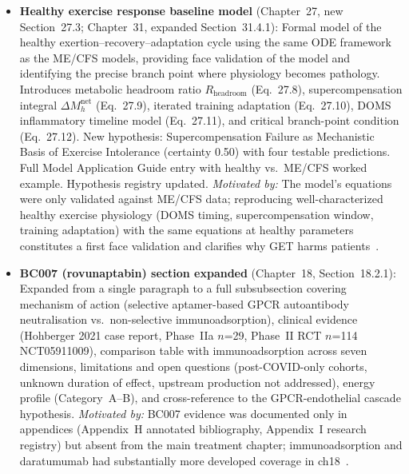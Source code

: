 \begin{itemize}
  \item \textbf{Healthy exercise response baseline model} (Chapter~27, new
    Section~27.3; Chapter~31, expanded Section~31.4.1): Formal model of the
    healthy exertion--recovery--adaptation cycle using the same ODE framework as
    the ME/CFS models, providing face validation of the model and identifying the
    precise branch point where physiology becomes pathology. Introduces metabolic
    headroom ratio $R_{\text{headroom}}$ (Eq.~27.8), supercompensation integral
    $\Delta M_h^{\text{net}}$ (Eq.~27.9), iterated training adaptation
    (Eq.~27.10), DOMS inflammatory timeline model (Eq.~27.11), and critical
    branch-point condition (Eq.~27.12). New hypothesis: Supercompensation Failure
    as Mechanistic Basis of Exercise Intolerance (certainty 0.50) with four
    testable predictions. Full Model Application Guide entry with healthy vs.\
    ME/CFS worked example. Hypothesis registry updated.
    \textit{Motivated by:} The model's equations were only validated against
    ME/CFS data; reproducing well-characterized healthy exercise physiology
    (DOMS timing, supercompensation window, training adaptation) with the same
    equations at healthy parameters constitutes a first face validation and
    clarifies why GET harms
    patients~\cite{Hood2009biogenesis,Clarkson2002DOMS,Peake2017muscle,Geraghty2019GET}.

  \item \textbf{BC007 (rovunaptabin) section expanded} (Chapter~18,
    Section~18.2.1): Expanded from a single paragraph to a full subsubsection
    covering mechanism of action (selective aptamer-based GPCR autoantibody
    neutralisation vs.\ non-selective immunoadsorption), clinical evidence
    (Hohberger 2021 case report, Phase~IIa $n$=29, Phase~II RCT $n$=114
    NCT05911009), comparison table with immunoadsorption across seven
    dimensions, limitations and open questions (post-COVID-only cohorts,
    unknown duration of effect, upstream production not addressed), energy
    profile (Category~A--B), and cross-reference to the GPCR-endothelial
    cascade hypothesis.
    \textit{Motivated by:} BC007 evidence was documented only in appendices
    (Appendix~H annotated bibliography, Appendix~I research registry) but
    absent from the main treatment chapter; immunoadsorption and daratumumab
    had substantially more developed coverage in
    ch18~\cite{Hohberger2021bc007}.


\end{itemize}
